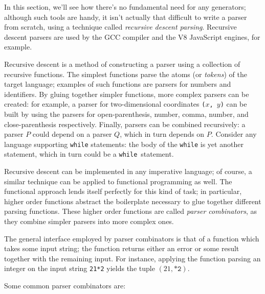 \documentclass[11pt, american, draft]{PhdThesis}
\begin{document}
  In this section, we'll see how there's no fundamental need for any generators; although such tools
  are handy, it isn't actually that difficult to write a parser from scratch, using a technique
  called \emph{recursive descent parsing}. Recursive descent parsers are used by the GCC compiler
  and the V8 JavaScript engines, for example\cite{nystrom}.

  Recursive descent is a method of constructing a parser using a collection of recursive functions.
  The simplest functions parse the atoms (or \emph{tokens}) of the target language; examples of such
  functions are parsers for numbers and identifiers. By gluing together simpler functions, more
  complex parsers can be created: for example, a parser for two-dimensional coordinates
  \texttt{($x$, $y$)} can be built by using the parsers for open-parenthesis, number, comma, number,
  and close-parenthesis respectively. Finally, parsers can be combined recursively: a parser $P$
  could depend on a parser $Q$, which in turn depends on $P$. Consider any language supporting
  \texttt{while} statements: the body of the \texttt{while} is yet another statement, which in turn
  could be a \texttt{while}~statement.

  Recursive descent can be implemented in any imperative language; of course, a similar technique
  can be applied to functional programming as well. The functional approach lends itself perfectly
  for this kind of task; in particular, higher order functions abstract the boilerplate necessary to
  glue together different parsing functions. These higher order functions are called \emph{parser
  combinators}, as they combine simpler parsers into more complex ones.

  \newpage

  The general interface employed by parser combinators is that of a function which takes some input
  string; the function returns either an error or some result together with the remaining input. For
  instance, applying the function parsing an integer on the input string \texttt{21*2} yields the
  tuple $\left(21, \texttt{*2}\right)$.

  Some common parser combinators are:
\end{document}
